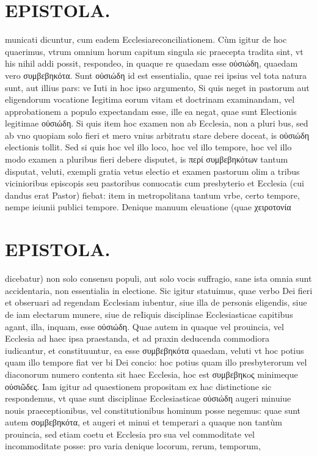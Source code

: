 \documentclass{article}
\begin{document}
\begin{pages}
\section*{EPISTOLA. }\pstart municati dicuntur, cum eadem Ecclesiareconciliationem. Cùm igitur de hoc quaerimus, vtrum omnium horum capitum singula sic praecepta tradita sint, vt his nihil addi possit, respondeo, in quaque re quaedam esse οὐσιώδη, quaedam vero συμβεβηκότα. Sunt οὐσιώδη id est essentialia, quae rei ipsius vel tota natura sunt, aut illius pars: ve Iuti in hoc ipso argumento, Si quis neget in pastorum aut eligendorum vocatione Iegitima eorum vitam et doctrinam examinandam, vel approbationem a populo expectandam esse, ille ea negat, quae sunt Electionis legitimae οὐσιώδη. Si quis item hoc examen non ab Ecclesia, non a pluri bus, sed ab vno quopiam solo fieri et mero vnius arbitratu stare debere doceat, is οὐσιώδη electionis tollit. Sed si quis hoc vel illo loco, hoc vel illo tempore, hoc vel illo modo examen a pluribus  fieri debere disputet, is περί συμβεβηκότων tantum disputat, veluti, exempli gratia vetus electio et examen pastorum olim a tribus vicinioribus episcopis seu pastoribus conuocatis cum presbyterio et Ecclesia (cui dandus erat Pastor) fiebat: item in metropolitana tantum vrbe, certo tempore, nempe ieiunii publici tempore. Denique manuum eleuatione (quae χειροτονία  \pend
\section*{EPISTOLA. }\pstart dicebatur) non solo consensu populi, aut solo vocis suffragio, sane ista omnia sunt accidentaria, non essentialia in electione. Sic igitur statuimus, quae verbo Dei fieri et obseruari ad regendam Ecclesiam iubentur, siue illa de personis eligendis, siue de iam electarum munere, siue de reIiquis disciplinae Ecclesiasticae capitibus agant, illa, inquam, esse οὐσιώδη. Quae autem in quaque vel prouincia, vel Ecclesia ad haec ipsa praestanda, et ad praxin deducenda commodiora iudicantur, et constituuntur, ea esse συμβεβηκότα quaedam, veluti vt hoc potius quam illo tempore fiat ver bi Dei concio: hoc potius quam illo presbyterorum vel diaconorum numero contenta sit haec Ecclesia, hoc est συμβεβηκoς minimeque οὐσιῶδες. Iam igitur ad quaestionem propositam ex hac distinctione sic respondemus, vt quae sunt disciplinae Ecclesiasticae οὐσιώδη augeri minuiue nouis praeceptionibus, vel constitutionibus hominum posse negemus: quae sunt autem σομβεβηκότα, et augeri et minui et temperari a quaque non tantùm prouincia, sed etiam coetu et Ecclesia pro sua vel commoditate vel incommoditate posse: pro varia denique locorum, rerum, temporum,  \pend

\end{pages}
\end{document}
